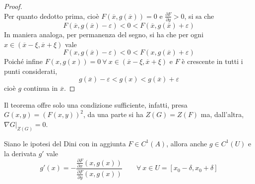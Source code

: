 \begin{proof}
\begin{equation*}
       \end{equation*}
       Per quanto dedotto prima, cioè $F(\overline{x}, g(\overline{x}))=0$ e $\frac{\partial{F}}{\partial{y}}>0$, si sa che 
       \begin{equation*}
           F(\overline{x}, g(\overline{x})-\varepsilon)<0<F(\overline{x}, g(\overline{x})+\varepsilon)
       \end{equation*}
       In maniera analoga, per permanenza del segno, si ha che per ogni $x \in (\overline{x}-\xi, \overline{x}+\xi)$ vale
       \begin{equation*}
           F(x, g(\overline{x})-\varepsilon)<0<F(x, g(\overline{x})+\varepsilon)
       \end{equation*}
       Poiché infine $F(x, g(x))=0\ \forall\ x \in (\overline{x}-\xi, \overline{x}+\xi)$ e $F$ è crescente in tutti i punti considerati,
       \begin{equation*}
           g(\overline{x})- \varepsilon < g(x) < g(\overline{x})+\varepsilon
       \end{equation*}
       cioè $g$ continua in $\overline{x}$.
       \end{proof}
\begin{oss}
    Il teorema offre solo una condizione sufficiente, infatti, presa $G(x,y)=(F(x,y))^2$, da una parte si ha $Z(G)=Z(F)$ ma, dall'altra, $\nabla G \big|_{Z(G)}=0$.
\end{oss}
\begin{theorem}
Siano le ipotesi del Dini con in aggiunta $F \in C^1(A)$, allora anche $g \in C^1(U)$ e la derivata $g'$ vale
\begin{equation*}
    g'(x)=-\frac{\frac{\partial{F}}{\partial{x}}(x, g(x))}{\frac{\partial{F}}{\partial{y}}(x, g(x))} \qquad \forall\ x \in U=[x_0-\delta, x_0+\delta]
\end{equation*}
\end{theorem}
